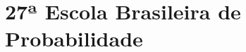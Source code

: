 \documentclass{hipatia}
\begin{document}
\section{27ª Escola Brasileira de Probabilidade} %
%
%
%
%
\end{document}
